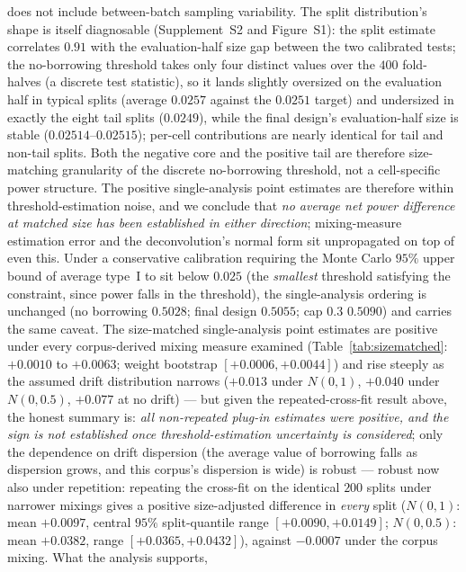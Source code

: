 \documentclass[11pt]{article}
\begin{document}
does not include between-batch sampling variability. The split
distribution's shape is itself diagnosable (Supplement~S2 and
Figure~S1): the split estimate correlates $0.91$ with the
evaluation-half size gap between the two calibrated tests; the
no-borrowing threshold takes only four distinct values over the $400$
fold-halves (a discrete test statistic), so it lands slightly oversized
on the evaluation half in typical splits (average $0.0257$ against the
$0.0251$ target) and undersized in exactly the eight tail splits
($0.0249$), while the final design's evaluation-half size is stable
($0.02514$--$0.02515$); per-cell contributions are nearly identical for
tail and non-tail splits. Both the negative core and the positive tail
are therefore size-matching granularity of the discrete no-borrowing
threshold, not a cell-specific power structure. The
positive single-analysis point estimates are therefore within
threshold-estimation noise, and we conclude that \emph{no average net
power difference at matched size has been established in either
direction}; mixing-measure estimation error and the deconvolution's
normal form sit unpropagated on top of even this. Under a conservative
calibration requiring the Monte Carlo $95\%$ upper bound of average
type~I to sit below $0.025$ (the \emph{smallest} threshold satisfying the
constraint, since power falls in the threshold), the single-analysis
ordering is unchanged (no borrowing
$0.5028$; final design $0.5055$; cap $0.3$ $0.5090$) and carries the same
caveat. The size-matched
single-analysis point estimates are positive under every corpus-derived
mixing measure examined
(Table~\ref{tab:sizematched}: $+0.0010$ to $+0.0063$; weight bootstrap
$[+0.0006, +0.0044]$) and rise steeply as the assumed
drift distribution narrows ($+0.013$ under $N(0,1)$, $+0.040$ under
$N(0,0.5)$, $+0.077$ at no drift) --- but given the repeated-cross-fit
result above, the honest summary is: \emph{all non-repeated plug-in
estimates were positive, and the sign is not established once
threshold-estimation
uncertainty is considered}; only the dependence on drift dispersion (the
average value of borrowing falls as dispersion grows, and this corpus's
dispersion is wide) is robust --- robust now also under repetition:
repeating the cross-fit on the identical $200$ splits under narrower
mixings gives a positive size-adjusted difference in \emph{every} split
($N(0,1)$: mean $+0.0097$, central $95\%$ split-quantile range
$[+0.0090,+0.0149]$; $N(0,0.5)$: mean $+0.0382$, range
$[+0.0365,+0.0432]$), against $-0.0007$ under the corpus mixing. What
the analysis supports,
\end{document}
